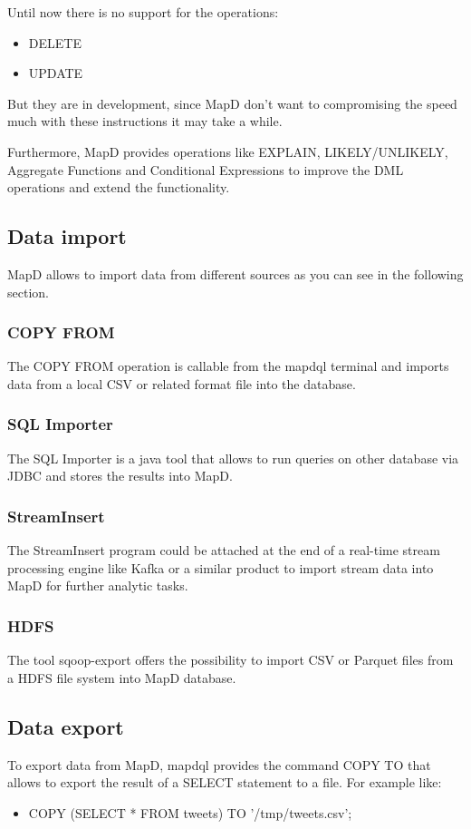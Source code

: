 Until now there is no support for the operations:
\begin{itemize}
 \item DELETE
 \item UPDATE
\end{itemize}
But they are in development, since MapD don't want to compromising the speed much with these instructions it may take a while.

Furthermore, MapD provides operations like EXPLAIN, LIKELY/UNLIKELY, Aggregate Functions and Conditional Expressions to improve the DML operations and extend the functionality.

\subsection{Data import}
MapD allows to import data from different sources as you can see in the following section.

\subsubsection{COPY FROM}
The COPY FROM operation is callable from the mapdql terminal and imports data from a local CSV or related format file into the database.

\subsubsection{SQL Importer}
The SQL Importer is a java tool that allows to run queries on other database via JDBC and stores the results into MapD.

\subsubsection{StreamInsert}
The StreamInsert program could be attached at the end of a real-time stream processing engine like Kafka or a similar product to import stream data into MapD for further analytic tasks.

\subsubsection{HDFS}
The tool sqoop-export offers the possibility to import CSV or Parquet files from a HDFS file system into MapD database.

\subsection{Data export}
To export data from MapD, mapdql provides the command COPY TO that allows to export the result of a SELECT statement to a file.
For example like:
\begin{itemize}
 \item COPY (SELECT * FROM tweets) TO '/tmp/tweets.csv';
\end{itemize}


